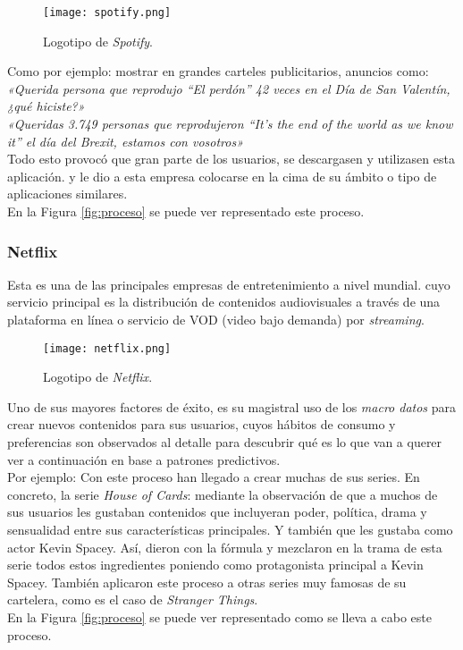 \documentclass[11pt]{diazessay} %
\begin{document}
\begin{figure}[h!]
	\centering
	\texttt{[image: spotify.png]}
	\caption{Logotipo de \textit{Spotify}.}
	\label{fig:spotify}
\end{figure}

\clearpage
Como por ejemplo: mostrar en grandes carteles publicitarios, anuncios como:\\
\textit{«Querida persona que reprodujo “El perdón” 42 veces en el Día de San Valentín, ¿qué hiciste?»}\\
\textit{«Queridas 3.749 personas que reprodujeron “It’s the end of the world as we know it” el día del Brexit, estamos con vosotros»}\\

Todo esto provocó que gran parte de los usuarios, se descargasen y utilizasen esta aplicación. y le dio a esta empresa colocarse en la cima de su ámbito o tipo de aplicaciones similares.\\
En la Figura \ref{fig:proceso} se puede ver representado este proceso.\\


\subsubsection*{Netflix}
Esta es una de las principales empresas de entretenimiento a nivel mundial. cuyo servicio principal es la distribución de contenidos audiovisuales a través de una plataforma en línea o servicio de VOD (video bajo demanda) por \textit{streaming}.

\begin{figure}[h!]
	\centering
	\texttt{[image: netflix.png]}
	\caption{Logotipo de \textit{Netflix}.}
	\label{fig:netflix}
\end{figure}

Uno de sus mayores factores de éxito, es su magistral uso de los \textit{macro datos} para crear nuevos contenidos para sus usuarios, cuyos hábitos de consumo y preferencias son observados al detalle para descubrir qué es lo que van a querer ver a continuación en base a patrones predictivos.\\

Por ejemplo: Con este proceso han llegado a crear muchas de sus series. En concreto, la serie \textit{House of Cards}: mediante la observación de que a muchos de sus usuarios les gustaban contenidos que incluyeran poder, política, drama y sensualidad entre sus características principales. Y también que les gustaba como actor Kevin Spacey. Así, dieron con la fórmula y mezclaron en la trama de esta serie todos estos ingredientes poniendo como protagonista principal a Kevin Spacey. También aplicaron este proceso a otras series muy famosas de su cartelera, como es el caso de \textit{Stranger Things}.\\
En la Figura \ref{fig:proceso} se puede ver representado como se lleva a cabo este proceso.\\
\clearpage
\end{document}
